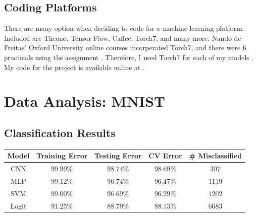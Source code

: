 \documentclass[11pt]{article}
\begin{document}
\subsection{Coding Platforms}
There are many option when deciding to code for a machine learning platform. Included are Theono, Tensor Flow, Caffee, Torch7, and many more. Nando de Freitas' Oxford University online courses incorperated Torch7, and there were $6$ practicals using the assignment \cite{Freitas}. Therefore, I used Torch7 for each of my models \cite{torch}. My code for the project is available online at \cite{Kent}.

\section{Data Analysis: MNIST}
\subsection{Classification Results}

\begin{center}
  \begin{tabular}{|c|c|c|c|c|}
    \hline
    Model & Training Error & Testing Error & CV Error & \# Misclassified\\
    \hline
    CNN & $99.99\%$ & $98.74\%$ & $98.69\%$ & $307$ \\
    \hline
    MLP & $99.12\%$ & $96.74\%$ & $96.47\%$ & $1119$ \\
    \hline
    SVM & $99.00\%$ & $96.69\%$ & $96.29\%$ & $1202$ \\
    \hline
    Logit & $91.25\%$ & $88.79\%$ & $88.13\%$ & $6683$ \\
    \hline
  \end{tabular}
\end{center}
\end{document}
